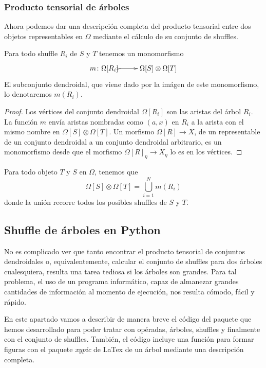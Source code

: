 \documentclass[../main.tex]{subfiles}
\begin{document}
\subsubsection{Producto tensorial de \'arboles}
Ahora podemos dar una descripci\'on completa del producto tensorial entre dos objetos representables en $\Omega$ mediante el c\'alculo de su conjunto de shuffles.
\begin{lema}
    Para todo shuffle $R_i$ de $S$ y $T$ tenemos un monomorfismo
    $$
        \xymatrix{
            m\colon\Omega[R_i] \ar@{>->}[r] & \Omega[S]\otimes\Omega[T]
        }
    $$
    El subconjunto dendroidal, que viene dado por la im\'agen de este monomorfismo, lo denotaremos $m(R_i)$.
\end{lema}
\begin{proof}
    Los v\'ertices del conjunto dendroidal $\Omega[R_i]$ son las aristas del \'arbol $R_i$. La funci\'on $m$ env\'ia aristas nombradas como $(a, x)$ en $R_i$ a la arista con el mismo nombre en $\Omega[S]\otimes\Omega[T]$.
    Un morfismo $\Omega[R]\to X$, de un representable de un conjunto dendroidal a un conjunto dendroidal arbitrario, es un monomorfismo desde que el morfismo $\Omega[R]_\eta \to X_\eta$ lo es en los v\'ertices.

\end{proof}
\begin{corol}
    Para todo objeto $T$ y $S$ en $\Omega$, tenemos que
    $$
        \Omega[S]\otimes\Omega[T] = \bigcup_{i=1}^{N} m(R_i)
    $$
    donde la uni\'on recorre todos los posibles shuffles de $S$ y $T$.
\end{corol}

\newpage
\subsection{Shuffle de \'arboles en Python}
No es complicado ver que tanto encontrar el producto tensorial de conjuntos dendroidales o, equivalentemente, calcular el conjunto de shuffles para dos \'arboles cualesquiera, resulta una tarea tediosa si los \'arboles son grandes. Para tal problema, el uso de un programa inform\'atico, capaz de almanezar grandes cantidades de informaci\'on al momento de ejecuci\'on, nos resulta c\'omodo, f\'acil y r\'apido.

En este apartado vamos a describir de manera breve el c\'odigo del paquete que hemos desarrollado para poder tratar con op\'eradas, \'arboles, shuffles y finalmente con el conjunto de shuffles. Tambi\'en, el c\'odigo incluye una funci\'on para formar figuras con el paquete \textit{xypic} de LaTex de un \'arbol mediante una descripci\'on completa.
\end{document}
